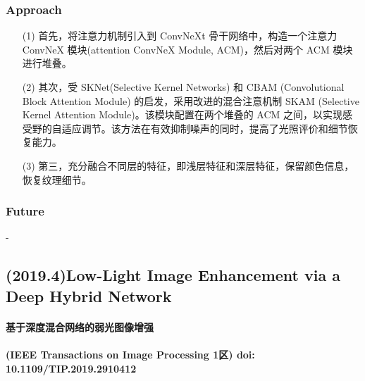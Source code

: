 \documentclass[a4paper]{ctexart}
\begin{document}
	
	\subsubsection{Approach}
	
	\begin{itemize}
		\item[(1)] 
		首先，将注意力机制引入到 ConvNeXt 骨干网络中，构造一个注意力 ConvNeX 模块(attention ConvNeX Module, ACM)，然后对两个 ACM 模块进行堆叠。
		
		\item[(2)]
		其次，受 SKNet(Selective Kernel Networks) 和 CBAM (Convolutional Block Attention Module) 的启发，采用改进的混合注意机制 SKAM (Selective Kernel Attention Module)。该模块配置在两个堆叠的 ACM 之间，以实现感受野的自适应调节。该方法在有效抑制噪声的同时，提高了光照评价和细节恢复能力。
		
		\item[(3)]
		第三，充分融合不同层的特征，即浅层特征和深层特征，保留颜色信息，恢复纹理细节。
	\end{itemize}				
	
	\subsubsection{Future}
	
	-
	
	\subsection{(2019.4)Low-Light Image Enhancement via a Deep Hybrid Network}
	
	\paragraph{基于深度混合网络的弱光图像增强}
	
	\paragraph{(IEEE Transactions on Image Processing 1区) doi: 10.1109/TIP.2019.2910412}
	
\end{document}
